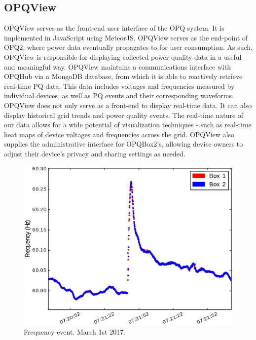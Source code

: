 \documentclass[a4paper, conference]{IEEEtran}
\begin{document}


\subsection{OPQView}
OPQView serves as the front-end user interface of the OPQ system. It is implemented in JavaScript using MeteorJS.\cite{akkijyrkka2015dynamic} OPQView serves as the end-point of OPQ2, where power data eventually propagates to for user consumption. As such, OPQView is responsible for displaying collected power quality data in a useful and meaningful way. OPQView maintains a communications interface with OPQHub via a MongoDB database, from which it is able to reactively retrieve real-time PQ data. This data includes voltages and frequencies measured by individual devices, as well as PQ events and their corresponding waveforms.  OPQView does not only serve as a front-end to display real-time data. It can also display historical grid trends and power quality events. 
The real-time nature of our data allows for a wide potential of visualization techniques - such as real-time heat maps of device voltages and frequencies across the grid. OPQView also supplies the administrative interface for OPQBox2's, allowing device owners to adjust their device's privacy and sharing settings as needed. 

\begin{figure}[h]
    \centering
    \includegraphics[width=0.9\columnwidth]{img/Event1_f.eps}
    \caption{Frequency event. March 1st 2017.}
    \label{fig:event}
\end{figure}
\end{document}
